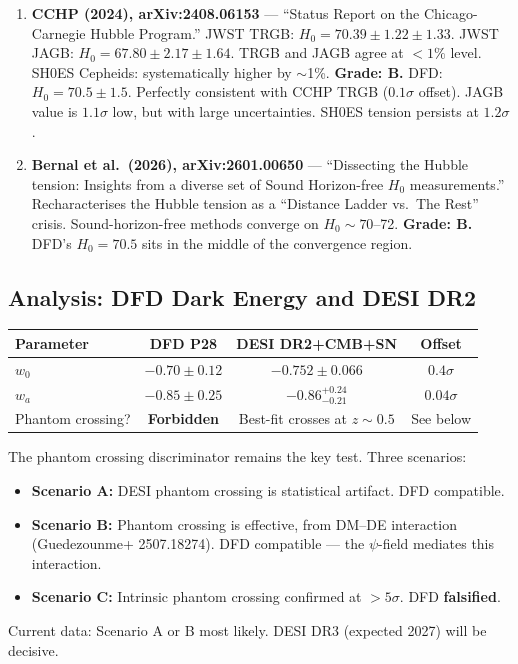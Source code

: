 \documentclass[11pt,a4paper]{article}
\begin{document}
\begin{enumerate}
\item \textbf{CCHP (2024), arXiv:2408.06153} --- ``Status Report on the Chicago-Carnegie Hubble Program.'' JWST TRGB: $H_0 = 70.39 \pm 1.22 \pm 1.33$. JWST JAGB: $H_0 = 67.80 \pm 2.17 \pm 1.64$. TRGB and JAGB agree at $<1\%$ level. SH0ES Cepheids: systematically higher by $\sim$1\%. \textbf{Grade: B.} DFD: $H_0 = 70.5 \pm 1.5$. Perfectly consistent with CCHP TRGB ($0.1\sigma$ offset). JAGB value is $1.1\sigma$ low, but with large uncertainties. SH0ES tension persists at $1.2\sigma$.

\item \textbf{Bernal et al.\ (2026), arXiv:2601.00650} --- ``Dissecting the Hubble tension: Insights from a diverse set of Sound Horizon-free $H_0$ measurements.'' Recharacterises the Hubble tension as a ``Distance Ladder vs.\ The Rest'' crisis. Sound-horizon-free methods converge on $H_0 \sim 70$--72. \textbf{Grade: B.} DFD's $H_0 = 70.5$ sits in the middle of the convergence region.

\end{enumerate}

\subsection{Analysis: DFD Dark Energy and DESI DR2}

\begin{center}
\begin{tabular}{lccc}
\toprule
\textbf{Parameter} & \textbf{DFD P28} & \textbf{DESI DR2+CMB+SN} & \textbf{Offset} \\
\midrule
$w_0$ & $-0.70 \pm 0.12$ & $-0.752 \pm 0.066$ & $0.4\sigma$ \\
$w_a$ & $-0.85 \pm 0.25$ & $-0.86^{+0.24}_{-0.21}$ & $0.04\sigma$ \\
Phantom crossing? & \textbf{Forbidden} & Best-fit crosses at $z \sim 0.5$ & See below \\
\bottomrule
\end{tabular}
\end{center}

The phantom crossing discriminator remains the key test. Three scenarios:
\begin{itemize}
\item \textbf{Scenario A:} DESI phantom crossing is statistical artifact. DFD compatible.
\item \textbf{Scenario B:} Phantom crossing is effective, from DM--DE interaction (Guedezounme+ 2507.18274). DFD compatible --- the $\psi$-field mediates this interaction.
\item \textbf{Scenario C:} Intrinsic phantom crossing confirmed at $>5\sigma$. DFD \textbf{falsified}.
\end{itemize}
Current data: Scenario A or B most likely. DESI DR3 (expected 2027) will be decisive.
\end{document}
